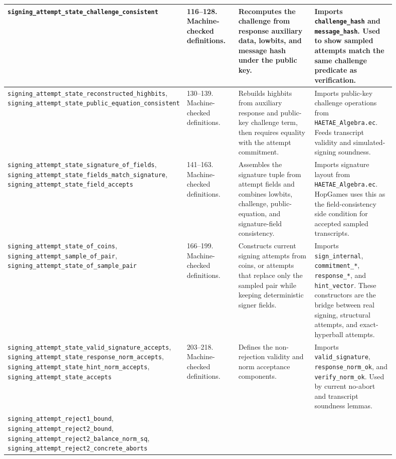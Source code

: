 \documentclass[11pt]{report}
\DeclareRobustCommand{\file}[1]{\ifmmode\text{\nolinkurl{#1}}\else\nolinkurl{#1}\fi}
\DeclareRobustCommand{\ec}[1]{\ifmmode\text{\nolinkurl{#1}}\else\nolinkurl{#1}\fi}
\theoremstyle{definition}
\theoremstyle{plain}
\begin{document}
{\begin{longtable}{p{0.24\linewidth}p{0.15\linewidth}p{0.27\linewidth}p{0.24\linewidth}}
\ec{signing\_attempt\_state\_challenge\_consistent} &
116--128. Machine-checked definitions. &
Recomputes the challenge from response auxiliary data, lowbits, and message
hash under the public key. &
Imports \ec{challenge\_hash} and \ec{message\_hash}.  Used to show sampled
attempts match the same challenge predicate as verification. \\
\midrule
\ec{signing\_attempt\_state\_reconstructed\_highbits},
\ec{signing\_attempt\_state\_public\_equation\_consistent} &
130--139. Machine-checked definitions. &
Rebuilds highbits from auxiliary response and public-key challenge term, then
requires equality with the attempt commitment. &
Imports public-key challenge operations from \file{HAETAE\_Algebra.ec}.  Feeds
transcript validity and simulated-signing soundness. \\
\midrule
\ec{signing\_attempt\_state\_signature\_of\_fields},
\ec{signing\_attempt\_state\_fields\_match\_signature},
\ec{signing\_attempt\_state\_field\_accepts} &
141--163. Machine-checked definitions. &
Assembles the signature tuple from attempt fields and combines lowbits,
challenge, public-equation, and signature-field consistency. &
Imports signature layout from \file{HAETAE\_Algebra.ec}.  HopGames uses this
as the field-consistency side condition for accepted sampled transcripts. \\
\midrule
\ec{signing\_attempt\_state\_of\_coins},
\ec{signing\_attempt\_sample\_of\_pair},
\ec{signing\_attempt\_state\_of\_sample\_pair} &
166--199. Machine-checked definitions. &
Constructs current signing attempts from coins, or attempts that replace only
the sampled pair while keeping deterministic signer fields. &
Imports \ec{sign\_internal}, \ec{commitment\_*}, \ec{response\_*}, and
\ec{hint\_vector}.  These constructors are the bridge between real signing,
structural attempts, and exact-hyperball attempts. \\
\midrule
\ec{signing\_attempt\_state\_valid\_signature\_accepts},
\ec{signing\_attempt\_state\_response\_norm\_accepts},
\ec{signing\_attempt\_state\_hint\_norm\_accepts},
\ec{signing\_attempt\_state\_accepts} &
203--218. Machine-checked definitions. &
Defines the non-rejection validity and norm acceptance components. &
Imports \ec{valid\_signature}, \ec{response\_norm\_ok}, and
\ec{verify\_norm\_ok}.  Used by current no-abort and transcript soundness
lemmas. \\
\midrule
\ec{signing\_attempt\_reject1\_bound},
\ec{signing\_attempt\_reject2\_bound},
\ec{signing\_attempt\_reject2\_balance\_norm\_sq},
\ec{signing\_attempt\_reject2\_concrete\_aborts} &

\end{longtable}}
\end{document}
